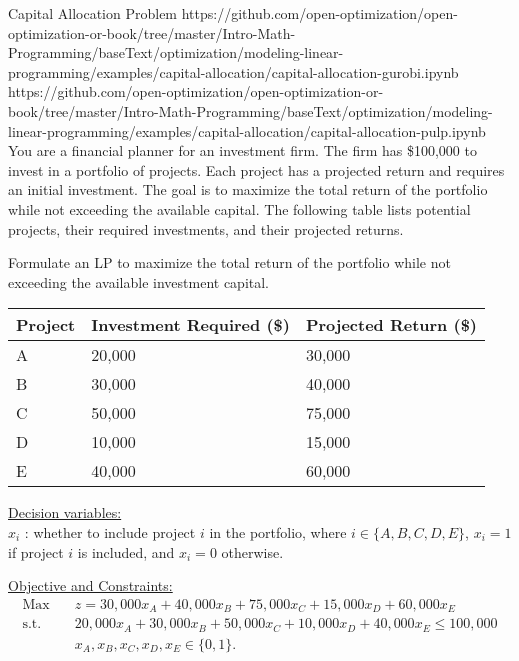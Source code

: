 \begin{examplewithallcode}{Capital Allocation Problem}
    {}
    {https://github.com/open-optimization/open-optimization-or-book/tree/master/Intro-Math-Programming/baseText/optimization/modeling-linear-programming/examples/capital-allocation/capital-allocation-gurobi.ipynb}
    {https://github.com/open-optimization/open-optimization-or-book/tree/master/Intro-Math-Programming/baseText/optimization/modeling-linear-programming/examples/capital-allocation/capital-allocation-pulp.ipynb}
    You are a financial planner for an investment firm. The firm has \$100,000 to invest in a portfolio of projects. Each project has a projected return and requires an initial investment. The goal is to maximize the total return of the portfolio while not exceeding the available capital. The following table lists potential projects, their required investments, and their projected returns.
    
    Formulate an LP to maximize the total return of the portfolio while not exceeding the available investment capital.
    \end{examplewithallcode}
    
    
    \begin{table}[h!] \begin{center} \begin{tabular} {|l|l|l|} 
    \hline Project & Investment Required (\$) & Projected Return (\$)  \\ \hline
    \hline  A & 20,000 & 30,000  \\
    \hline  B & 30,000 & 40,000  \\
    \hline  C & 50,000 & 75,000  \\
    \hline  D & 10,000 & 15,000  \\
    \hline  E & 40,000 & 60,000  \\
    \hline \end{tabular} \end{center} \end{table}
    
    
    \begin{solution}
    \underline{Decision variables:} \\
    $x_i$ : whether to include project $i$ in the portfolio, where $i \in \{A, B, C, D, E\}$, $x_i = 1$ if project $i$ is included, and $x_i = 0$ otherwise.
    
    \smallskip \underline{Objective and Constraints:}
    \begin{align*}
    \mbox{Max~~ } & z = 30,000x_A + 40,000x_B + 75,000x_C + 15,000x_D + 60,000x_E  \\
    \mbox{s.t.~~} & 20,000x_A + 30,000x_B + 50,000x_C + 10,000x_D + 40,000x_E \le 100,000 \\
    & x_A, x_B, x_C, x_D, x_E \in \{0,1\}.
    \end{align*}
    \end{solution}
    
